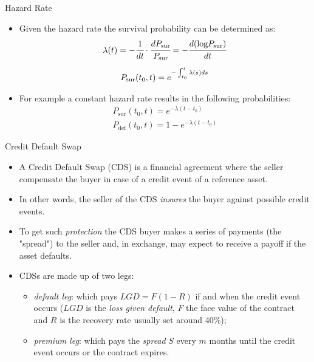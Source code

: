 \documentclass{beamer}
\begin{document}
\begin{frame}{Hazard Rate}
	\begin{itemize}
		\item Given the hazard rate the survival probability can be determined as:
		\begin{gather*}
		\lambda(t) = -\cfrac{1}{dt}\cdot\cfrac{dP_{\textrm{sur}}}{P_{\textrm{sur}}} = -\cfrac{d(\textrm{log}P_{\textrm{sur}})}{dt}\\[5pt]
		P_{\textrm{sur}}(t_0, t) = e^{-\int_{t_0}^{t}\lambda(s) ds}
		\end{gather*}
		
		\item For example a constant hazard rate results in the following probabilities:
		\begin{gather*}
			P_{\textrm{sur}}(t_0, t) = e^{-\lambda (t-t_0)}\\
			P_{\textrm{def}}(t_0, t) = 1 - e^{-\lambda (t-t_0)}
		\end{gather*}
	\end{itemize}
\end{frame}

\begin{frame}{Credit Default Swap}
\begin{itemize}
\item A Credit Default Swap (CDS) is a financial agreement where the seller compensate the buyer in case of a credit event of a reference asset.
\item In other words, the seller of the CDS \emph{insures} the buyer against possible credit events.
\item To get such \emph{protection} the CDS buyer makes a series of payments (the "spread") to the seller and, in exchange, may expect to receive a payoff if the asset defaults. 
\item CDSs are made up of two legs:
\begin{itemize}
    \item \emph{default leg}: which pays $LGD = F(1 - R)$ if and when the credit event occurs ($LGD$ is the \emph{loss given default}, $F$ the face value of the contract and $R$ is the recovery rate usually set around 40\%);
    \item \emph{premium leg}: which pays the \emph{spread} $S$ every $m$ months until the credit event occurs or the contract expires.
\end{itemize}
\end{itemize}
\end{frame}
\end{document}
